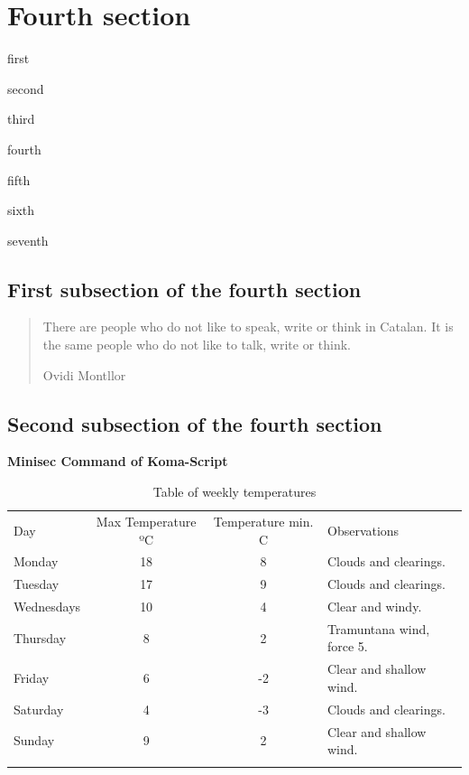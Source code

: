 \documentclass[a4paper,
                             twoside,
                             BCOR=1.0cm,
                             DIV=11,
                             parskip=full,
                             11pt]{scrbook}
\providecommand{\minisec}[1]{\par\medskip\noindent\textbf{#1}\par\nobreak\smallskip}
\let\shline\hline
\def\hline{\noalign{\vskip3pt}\shline\noalign{\vskip4pt}}
\begin{document}
\lipsum[4]
\section{Fourth section}\label{sec:fourth}
\lipsum[1]
\begin{steps}
    \item  first
    \item  second
    \item  third
    \item  fourth
    \item  fifth
    \item  sixth
    \item  seventh
\end{steps}
\subsection{First subsection of the fourth section}\label{sbsec:first}
\lipsum[1-3]
\begin{quote}
    There are people who do not like to speak, write or think in Catalan. It is the same people who do not like to talk, write or think.

    Ovidi Montllor
\end{quote}
\subsection{Second subsection of the fourth section}\label{sbsec:second}
\minisec{Minisec Command of Koma-Script}
\lipsum[4-5]
\begin{table}[h]
    \centering\scriptsize
    \begin{tabular}{l|c|c|l}
        \hline
        Day        & Max Temperature ºC & Temperature min. C & Observations              \\
        \hline
        Monday     & 18                 & 8                  & Clouds and clearings.     \\
        Tuesday    & 17                 & 9                  & Clouds and clearings.     \\
        Wednesdays & 10                 & 4                  & Clear and windy.          \\
        Thursday   & 8                  & 2                  & Tramuntana wind, force 5. \\
        Friday     & 6                  & -2                 & Clear and shallow wind.   \\
        Saturday   & 4                  & -3                 & Clouds and clearings.     \\
        Sunday     & 9                  & 2                  & Clear and shallow wind.   \\
        \hline
    \end{tabular}
    \caption{Table of weekly temperatures}\label{tab:temp2}
\end{table}
\lipsum[8-9]
\end{document}
